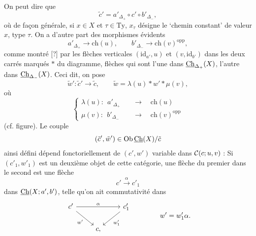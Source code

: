 On peut dire que
\[
\tilde{c}' = a'_{\Delta_{+}} \circ c' \circ b'_{\Delta_{-}},
\]
où de façon générale, si $x \in X$ et $\tau \in \mathrm{Ty}$, $x_{\tau}$ désigne le `chemin constant' de valeur $x$, type $\tau$. On a d'autre part des morphismes évidents
\[
a'_{\Delta_{+}} \longrightarrow \mathrm{ch}(u), \qquad b'_{\Delta_{-}} \longrightarrow \mathrm{ch}(v)^{\mathrm{opp}},
\]
comme montré [?] par les flèches verticales $(\mathrm{id}_{a'},u)$ et $(v,\mathrm{id}_{b'})$ dans les deux carrés marqués $\ast$ du diagramme, flèches qui sont l'une dans $\underline{\mathrm{Ch}}_{\Delta_{+}}(X)$, l'autre dans $\underline{\mathrm{Ch}}_{\Delta_{-}}(X)$. Ceci dit, on pose
\[
\tilde{w}' : \tilde{c}' \longrightarrow \tilde{c}, \qquad \tilde{w} = \lambda(u) \ast w' \ast \mu(v), %
\]
où
\[
\left\{
\begin{aligned}
\lambda(u) :\ \ a'_{\Delta_{+}} &\quad\longrightarrow\quad \mathrm{ch}(u) \\
\mu(v) :\ \ b'_{\Delta_{-}} &\quad\longrightarrow\quad \mathrm{ch}(v)^{\mathrm{opp}}
\end{aligned}
\right.
\]
(cf. figure). Le couple
\[
(\tilde{c}',\tilde{w}') \in \operatorname{Ob} \underline{\mathrm{Ch}}(X)/\tilde{c}
\]
ainsi défini dépend fonctoriellement de $(c',w')$ variable dans $\mathcal{C}(c;u,v)$ : Si $(c'_1,w'_1)$ est un deuxième objet de cette catégorie, une flèche du premier dans le second est une flèche
\[
c' \xrightarrow{\alpha} c'_1
\]
dans $\underline{\mathrm{Ch}}(X;a',b')$, telle qu'on ait commutativité dans
\[
\begin{tikzcd}
c' \ar[rr,"\alpha"] \ar[dr,"w'"'] & & c'_1 \ar[dl,"w'_1"] \\
& c, &
\end{tikzcd}
\qquad\qquad w' = w'_1\alpha.
\]


